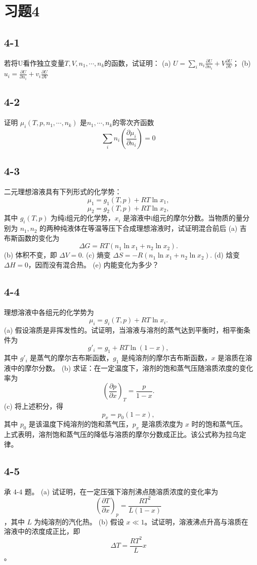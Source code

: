 \section{习题4}

\newpage
\subsection{4-1}
若将U看作独立变量$T,V,n_1,\cdots,n_k$的函数，试证明： (a) $U = \sum_i n_i \frac{\partial U}{\partial n_i} + V \frac{\partial U}{\partial V}$； (b) $u_i = \frac{\partial U}{\partial n_i} + v_i \frac{\partial U}{\partial V}$

\newpage
\subsection{4-2}
证明 $\mu_i (T,p,n_1,\cdots,n_k)$ 是$n_1,\cdots,n_k$的零次齐函数 \[ \sum_i n_i \left( \frac{\partial \mu_i}{\partial n_i} \right) = 0 \]

\newpage
\subsection{4-3}
二元理想溶液具有下列形式的化学势：
$$ \mu_1 = g_1 (T,p) + RT \ln x_1, $$
$$ \mu_2 = g_2 (T,p) + RT \ln x_2, $$
其中 $g_i (T,p)$ 为纯i组元的化学势，$x_i$ 是溶液中i组元的摩尔分数。当物质的量分别为 $n_1, n_2$ 的两种纯液体在等温等压下合成理想溶液时，试证明混合前后
(a) 吉布斯函数的变化为
$$ \Delta G = RT(n_1 \ln x_1 + n_2 \ln x_2). $$
(b) 体积不变，即 $\Delta V = 0.$
(c) 熵变 $\Delta S = -R(n_1 \ln x_1 + n_2 \ln x_2).$
(d) 焓变 $\Delta H = 0$，因而没有混合热。
(e) 内能变化为多少？

\newpage
\subsection{4-4}
理想溶液中各组元的化学势为
$$ \mu_i = g_i (T,p) + RT \ln x_i. $$
(a) 假设溶质是非挥发性的。试证明，当溶液与溶剂的蒸气达到平衡时，相平衡条件为
$$ g'_i = g_1 + RT \ln (1-x), $$
其中 $g'_i$ 是蒸气的摩尔吉布斯函数，$g_1$ 是纯溶剂的摩尔吉布斯函数，$x$ 是溶质在溶液中的摩尔分数。
(b) 求证：在一定温度下，溶剂的饱和蒸气压随溶质浓度的变化率为
$$ \left( \frac{\partial p}{\partial x} \right)_T = \frac{p}{1-x}. $$
(c) 将上述积分，得
$$ p_x = p_0 (1-x), $$
其中 $p_0$ 是该温度下纯溶剂的饱和蒸气压，$p_x$ 是溶质浓度为 $x$ 时的饱和蒸气压。上式表明，溶剂饱和蒸气压的降低与溶质的摩尔分数成正比。该公式称为拉乌定律。

\newpage
\subsection{4-5}
承 4-4 题。
(a) 试证明，在一定压强下溶剂沸点随溶质浓度的变化率为 $$ \left( \frac{\partial T}{\partial x} \right)_p = \frac{RT^2}{L(1-x)} $$ ，其中 $L$ 为纯溶剂的汽化热。
(b) 假设 $x \ll 1$。试证明，溶液沸点升高与溶质在溶液中的浓度成正比，即 $$ \Delta T = \frac{RT^2}{L}x $$。

